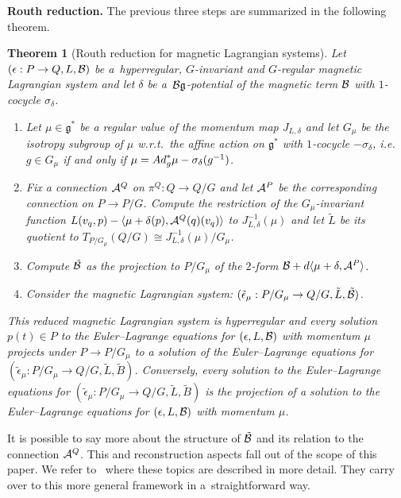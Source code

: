 \documentclass[11pt]{article}
\newtheorem{theorem}{Theorem}
\newcommand{\A}{{\cal A}}
\newcommand{\B}{{\cal B}}
\newcommand{\e}{\epsilon}
\newcommand{\lag}{\mathfrak{g}}
\begin{document}
{\bf Routh reduction.} The previous three steps are summarized in the following theorem.
\begin{theorem}[Routh reduction for magnetic Lagrangian systems]\label{thm:routh}
  Let $(\e:P\to Q,L,\B)$ be a~hyperregular, $G$-invariant and $G$-regular magnetic Lagrangian system and let $\delta$ be a~$\B\lag$-potential of the magnetic term $\B$ with $1$-cocycle $\sigma_\delta$.
  \begin{enumerate}\itemsep=0pt
  \item[$1.$] Let $\mu\in\lag^*$ be a regular value of the momentum map $J_{L,\delta}$ and let $G_\mu$ be the isotropy subgroup of $\mu$ w.r.t.\ the affine action on $\lag^*$ with $1$-cocycle $-\sigma_\delta$, i.e.\ $g\in G_\mu$ if and only if $\mu = {\rm Ad}^*_g\mu -\sigma_\delta(g^{-1})$.
  \item[$2.$] Fix a connection $\A^Q$ on $\pi^Q:Q\to Q/G$ and let $\A^P$ be the corresponding connection on $P\to P/G$. Compute the restriction of the $G_\mu$-invariant function $L(v_q,p)-\langle \mu+\delta(p),\A^Q(q)(v_q)\rangle$ to  $J^{-1}_{L,\delta}(\mu)$ and let $\tilde L$ be its quotient  to $T_{P/G_\mu}(Q/G) \cong J^{-1}_{L,\delta}(\mu)/G_\mu$.
 \item[$3.$] Compute $\tilde\B$ as the projection to $P/G_\mu$ of the $2$-form $\B+d\langle \mu+\delta,\A^P\rangle$.
\item[$4.$]  Consider the magnetic Lagrangian system: $(\tilde\e_\mu:P/G_\mu \to Q/G, \tilde L, \tilde \B)$.
 \end{enumerate}

 This reduced magnetic Lagrangian system is hyperregular and every solution $p(t)\in P$ to the Euler--Lagrange equations for $(\e,L,\B)$ with momentum $\mu$ projects under $P\to P/G_\mu$ to a solution of the Euler--Lagrange equations for $(\tilde\e_\mu:P/G_\mu \to Q/G, \tilde L, \tilde B)$. Conversely, every solution to the Euler--Lagrange equations for $(\tilde\e_\mu:P/G_\mu \to Q/G,\tilde L, \tilde B)$ is the projection of a solution to the Euler--Lagrange equations for $(\e,L,\B)$ with momentum $\mu$.
\end{theorem}

It is possible to say more about the structure of $\tilde \B$ and its relation to the connection $\A^Q$.  This and reconstruction aspects fall out of the scope of this paper. We refer to~\cite{BM} where these topics are described in more detail. They carry over to this more general framework in a~straightforward way.


\setcounter{section}{5}
\setcounter{subsection}{3}
\setcounter{subsubsection}{0}
\setcounter{equation}{3}
\setcounter{lemma}{4}
\end{document}
